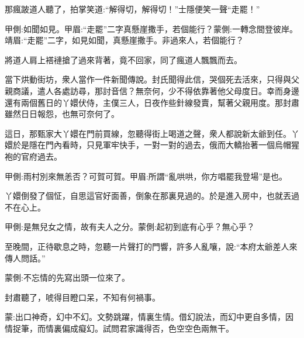 \begin{parag}
    那瘋跛道人聽了，拍掌笑道:“解得切，解得切！”士隱便笑一聲“走罷！”\begin{note}甲側:如聞如見。甲眉:“走罷”二字真懸崖撒手，若個能行？蒙側:一轉念間登彼岸。靖眉:“走罷”二字，如見如聞，真懸崖撒手。非過來人，若個能行？\end{note}將道人肩上褡褳搶了過來背著，竟不回家，同了瘋道人飄飄而去。
\end{parag}


\begin{parag}
    當下烘動街坊，衆人當作一件新聞傳說。封氏聞得此信，哭個死去活來，只得與父親商議，遣人各處訪尋，那討音信？無奈何，少不得依靠著他父母度日。幸而身邊還有兩個舊日的丫嬛伏侍，主僕三人，日夜作些針線發賣，幫著父親用度。那封肅雖然日日報怨，也無可奈何了。
\end{parag}


\begin{parag}
    這日，那甄家大丫嬛在門前買線，忽聽得街上喝道之聲，衆人都說新太爺到任。丫嬛於是隱在門內看時，只見軍牢快手，一對一對的過去，俄而大轎抬著一個烏帽猩袍的官府過去。\begin{note}甲側:雨村別來無恙否？可賀可賀。甲眉:所謂“亂哄哄，你方唱罷我登場”是也。\end{note}丫嬛倒發了個怔，自思這官好面善，倒象在那裏見過的。於是進入房中，也就丟過不在心上。\begin{note}甲側:是無兒女之情，故有夫人之分。蒙側:起初到底有心乎？無心乎？\end{note}至晚間，正待歇息之時，忽聽一片聲打的門響，許多人亂嚷，說:“本府太爺差人來傳人問話。”\begin{note}蒙側:不忘情的先寫出頭一位來了。\end{note}封肅聽了，唬得目瞪口呆，不知有何禍事。
\end{parag}


\begin{parag}
    \begin{note}蒙:出口神奇，幻中不幻。文勢跳躍，情裏生情。借幻說法，而幻中更自多情，因情捉筆，而情裏偏成癡幻。試問君家識得否，色空空色兩無干。\end{note}
\end{parag}

